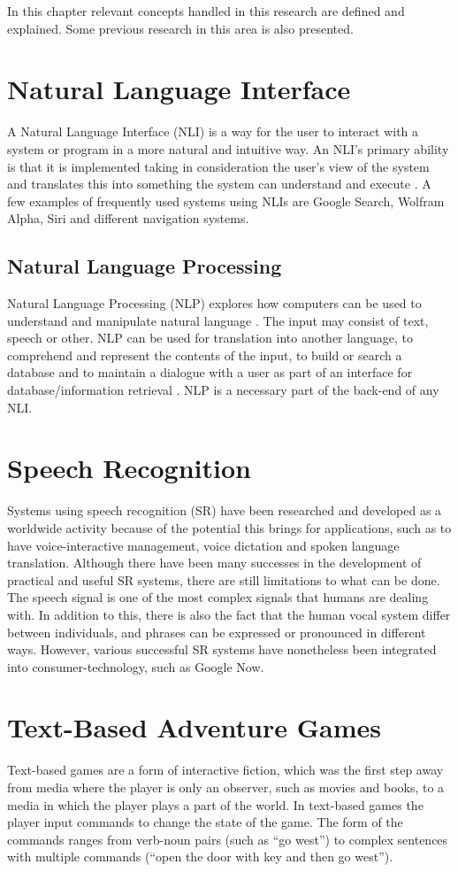 In this chapter relevant concepts handled in this research are defined and explained. Some previous research in this area is also presented.

\section{Natural Language Interface}
A Natural Language Interface (NLI) is a way for the user to interact with a system or program in a more natural and intuitive way. An NLI's primary ability is that it is implemented taking in consideration the user's view of the system and translates this into something the system can understand and execute \citep{Hend}. A few examples of frequently used systems using NLIs are Google Search, Wolfram Alpha, Siri and different navigation systems.

\subsection{Natural Language Processing}
Natural Language Processing (NLP) explores how computers can be used to understand and manipulate natural language \citep{Gobi}. The input may consist of text, speech or other. NLP can be used for translation into another language, to comprehend and represent the contents of the input, to build or search a database and to maintain a dialogue with a user as part of an interface for database/information retrieval \citep{Allen}. NLP is a necessary part of the back-end of any NLI.

\section{Speech Recognition}
Systems using speech recognition (SR) have been researched and developed as a worldwide activity because of the potential this brings for applications, such as to have voice-interactive management, voice dictation and spoken language translation. Although there have been many successes in the development of practical and useful SR systems, there are still limitations to what can be done. The speech signal is one of the most complex signals that humans are dealing with. In addition to this, there is also the fact that the human vocal system differ between individuals, and phrases can be expressed or pronounced in different ways. However, various successful SR systems have nonetheless been integrated into consumer-technology, such as Google Now. \citep[page 2]{SR}

\section{Text-Based Adventure Games}
Text-based games are a form of interactive fiction, which was the first step away from media where the player is only an observer, such as movies and books, to a media in which the player plays a part of the world. In text-based games the player input commands to change the state of the game. The form of the commands ranges from verb-noun pairs (such as ``go west'') to complex sentences with multiple commands (``open the door with key and then go west''). \citep[page 54-55]{Sweet}

